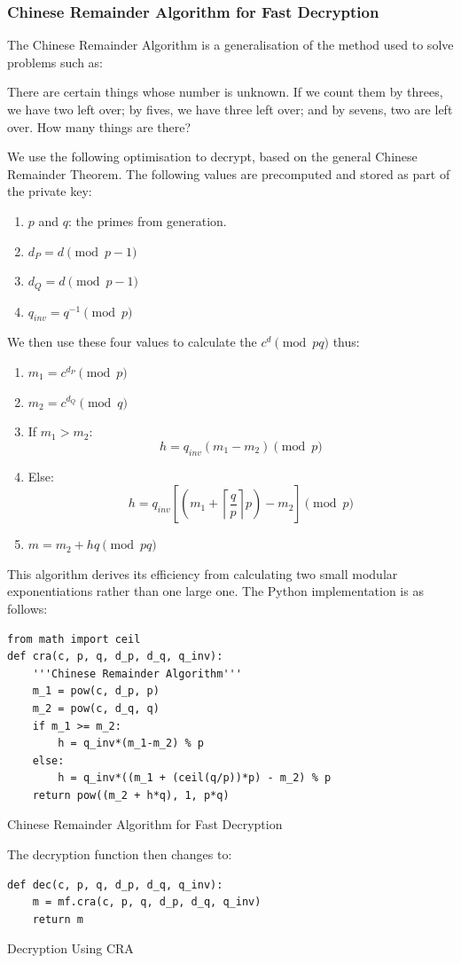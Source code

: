 \documentclass[twoside]{article}
\newenvironment{longlisting}{\captionsetup{type=listing}}{}
\begin{document}
\subsubsection{Chinese Remainder Algorithm for Fast Decryption}
The Chinese Remainder Algorithm is a generalisation of the method used to solve problems such as:
\begin{displayquote}
There are certain things whose number is unknown. If we count them by threes, we have two left over;
by fives, we have three left over; and by sevens, two are left over. How many things are there?
\end{displayquote}
We use the following optimisation to decrypt, based on the general Chinese Remainder Theorem. The
following values are precomputed and stored as part of the private key:
\begin{enumerate}
\item $p$ and $q$: the primes from generation.
\item $d_P = d \pmod{p-1}$
\item $d_Q = d \pmod{p-1}$
\item $q_{inv} = q^{-1} \pmod{p}$
\end{enumerate}

We then use these four values to calculate the $c^d \pmod{pq}$ thus:
\begin{enumerate}
\item $m_1 = c^{d_P} \pmod{p}$
\item $m_2 = c^{d_Q} \pmod{q}$
\item If $m_1 > m_2$: $$h = q_{inv}(m_1 - m_2) \pmod{p}$$
\item Else: $$h = q_{inv}[(m_1 + \left \lceil{\frac{q}{p}}\right \rceil p) - m_2] \pmod{p}$$
\item $m = m_2 + hq \pmod{pq}$
\end{enumerate}

This algorithm derives its efficiency from calculating two small modular exponentiations rather than
one large one. The Python implementation is as follows:
\begin{longlisting}
\begin{verbatim}
from math import ceil
def cra(c, p, q, d_p, d_q, q_inv):
    '''Chinese Remainder Algorithm'''
    m_1 = pow(c, d_p, p)
    m_2 = pow(c, d_q, q)
    if m_1 >= m_2:
        h = q_inv*(m_1-m_2) % p
    else:
        h = q_inv*((m_1 + (ceil(q/p))*p) - m_2) % p
    return pow((m_2 + h*q), 1, p*q)
\end{verbatim}
\caption{Chinese Remainder Algorithm for Fast Decryption}
\end{longlisting}
The decryption function then changes to:
\begin{longlisting}
\begin{verbatim}
def dec(c, p, q, d_p, d_q, q_inv):
    m = mf.cra(c, p, q, d_p, d_q, q_inv)
    return m
\end{verbatim}
\caption{Decryption Using CRA}
\end{longlisting}
\end{document}
